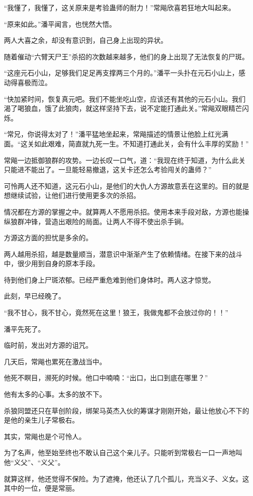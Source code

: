 \begin{this_body}
“我懂了，我懂了，这关原来是考验蛊师的耐力！”常飚欣喜若狂地大叫起来。

“原来如此。”潘平闻言，也恍然大悟。

两人大喜之余，却没有意识到，自己身上出现的异状。

随着催动“六臂天尸王”杀招的次数越来越多，他们的身上出现了无法恢复的尸斑。

“这座元石小山，足够我们足足再支撑两三个月的。”潘平一头扑在元石小山上，感动得喜极而泣。

“快加紧时间，恢复真元吧。我们不能坐吃山空，应该还有其他的元石小山。我们渴了喝狼血，饿了此狼肉，就这样坚持下去，说不定能打通此关。”常飚双眼精芒闪烁。

“常兄，你说得太对了！”潘平猛地坐起来，常飚描述的情景让他脸上红光满面。“这关如此艰难，简直就九死一生。不知道打通此关，会有什么丰厚的奖励！”

常飚一边抵御狼群的攻势。一边长叹一口气，道：“我现在终于知道，为什么此关只能进不能出了。一旦能轻易撤退，这关卡还怎么考验闯关的蛊师？”

可怜两人还不知道，这元石小山，是他们的大仇人方源故意丢在这里的。目的就是想继续试验，让他们进行使用更多次的杀招。

情况都在方源的掌握之中。就算两人不愿用杀招。使用本来手段对敌，方源也能操纵狼群冲锋，营造出艰险的局面。让两人不得不使出杀手锏。

方源这方面的担忧是多余的。

两人越用杀招，越是数量顺当，潜意识中渐渐产生了依赖情绪。在接下来的战斗中，很少用到自身的原本手段。

待到他们身上尸斑浓郁。已经严重危难到他们身体时。两人这才惊觉。

此刻，早已经晚了。

“我不甘心，我不甘心，竟然死在这里！狼王，我做鬼都不会放过你的！！”

潘平先死了。

临时前，发出对方源的诅咒。

几天后，常飚也累死在激战当中。

他死不瞑目，濒死的时候。他口中喃喃：“出口，出口到底在哪里？”

他有太多的心事。太多的放不下。

杀狼同盟还只在草创阶段，绑架马英杰入伙的筹谋才刚刚开始，最让他放心不下的是他的亲生儿子常极右。

其实，常飚也是个可怜人。

为了名声，他至始至终也不敢认自己这个亲儿子。只能听到常极右一口一声地叫他“义父”、“义父”。

就算这样，他还觉得不保险。为了遮掩，他还认了几个孤儿，充当义子、义女。这其中的一位，便是常丽。


\end{this_body}

